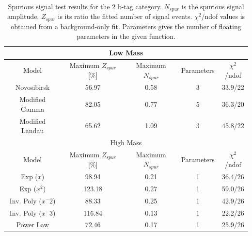 \begin{table}
  \centering
  \caption[Spurious signal test results for the 2 b-tag category]{Spurious signal test results for the 2 b-tag category. $N_{spur}$ is the spurious signal amplitude, $Z_{spur}$ is its ratio the fitted number of signal events. $\chi^2$/ndof values is obtained from a background-only fit. Parameters gives the number of floating parameters in the given function.}
  \label{tab:spurious-signal-2}
  \begin{tabular}{|c|c|c|c|c|}
    \hline
    \multicolumn{5}{|c|}{Low Mass}\\
    \hline
    Model     &   Maximum $Z_{spur}$ [\%]      &      Maximum $N_{spur}$      &   Parameters     &    $\chi^2$/ndof \\
    \hline
    Novosibirsk        & 56.97    &  0.58   & 3  & 33.9/22 \\
    Modified Gamma     & 82.05    &  0.77   & 5  & 36.3/20 \\
    Modified Landau    & 65.62    &  1.09   & 3  & 45.8/22 \\
    \hline
    \multicolumn{5}{|c|}{High Mass}\\
    \hline
    Model     &   Maximum $Z_{spur}$ [\%]      &      Maximum $N_{spur}$      &   Parameters     &    $\chi^2$/ndof \\
    \hline
    Exp ($x$)             &  98.94   & 0.21   & 1  & 36.4/26 \\
    Exp ($x^2$)           &  123.18   & 0.27   & 1  & 59.0/26 \\
    Inv. Poly ($x^-2$)    &  88.33   & 0.25   & 1  & 42.9/26 \\
    Inv. Poly ($x^-3$)    &  116.84   & 0.13   & 1  & 22.2/26 \\
    Power Law             &  72.46   & 0.17   & 1  & 25.9/26 \\
    \hline    
  \end{tabular}
\end{table}


